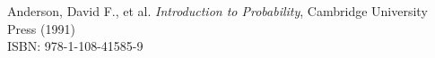 \documentclass[12pt]{book}
\begin{document}
%
%
%
%
%
%
%
%
%
%
%
%
%
%







































































\backmatter
\begin{thebibliography}{99}
Anderson, David F., et al. \emph{Introduction to Probability}, Cambridge University Press (1991) \\
ISBN: 978-1-108-41585-9
\end{thebibliography}
\end{document}
